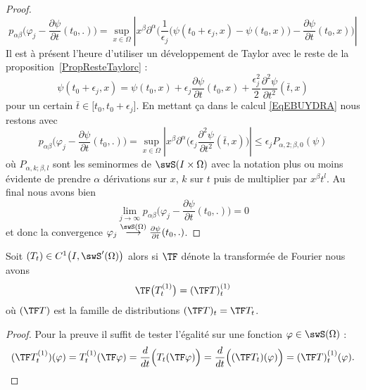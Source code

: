 \begin{proof}
\begin{equation}
            p_{\alpha\beta}\big( \varphi_j-\frac{ \partial \psi }{ \partial t }(t_0,.) \big)=\sup_{x\in\Omega}\left| x^{\beta}\partial^{\alpha}\Big( \frac{1}{ \epsilon_j }\big(\psi(t_0+\epsilon_j,x)-\psi(t_0,x)\big) -\frac{ \partial \psi }{ \partial t }(t_0,x) \Big)\right|
    \end{equation}
    Il est à présent l'heure d'utiliser un développement de Taylor avec le reste de la proposition~\ref{PropResteTaylorc} :
    \begin{equation}
        \psi(t_0+\epsilon_j,x)=\psi(t_0,x)+\epsilon_j\frac{ \partial \psi }{ \partial t }(t_0,x)+\frac{ \epsilon_j^2 }{2}\frac{ \partial^2\psi  }{ \partial t^2 }(\bar t,x)
    \end{equation}
    pour un certain \( \bar t\in\mathopen[ t_0 , t_0+\epsilon_j \mathclose]\). En mettant ça dans le calcul \eqref{EqEBUYDRA} nous restons avec
    \begin{equation}
        p_{\alpha\beta}\big( \varphi_j-\frac{ \partial \psi }{ \partial t }(t_0,.) \big)=\sup_{x\in\Omega}\left| x^{\beta}\partial^{\alpha}\Big( \epsilon_j\frac{ \partial^2\psi }{ \partial t^2 }(\bar t,x) \Big) \right| \leq \epsilon_j P_{\alpha,2;\beta,0}(\psi)
    \end{equation}
    où \( P_{\alpha,k;\beta,l}\) sont les seminormes de \( \swS(I\times \Omega)\) avec la notation plus ou moins évidente de prendre \( \alpha\) dérivations sur \( x\), \( k\) sur \( t\) puis de multiplier par \( x^{\beta}t^l\). Au final nous avons bien
    \begin{equation}
        \lim_{j\to \infty} p_{\alpha\beta}\big( \varphi_j-\frac{ \partial \psi }{ \partial t }(t_0,.) \big)=0
    \end{equation}
    et donc la convergence \( \varphi_j\stackrel{\swS(\Omega)}{\longrightarrow}\frac{ \partial \psi }{ \partial t }(t_0,.)\).
\end{proof}

\begin{lemma}   \label{LemWRoRPIX}
    Soit \( (T_t)\in C^1\big( I,\swS'(\Omega) \big)\) alors si \( \TF\) dénote la transformée de Fourier nous avons
    \begin{equation}
        \TF\big( T_t^{(1)} \big)=(\TF T)_t^{(1)}
    \end{equation}
    où \( (\TF T)\) est la famille de distributions \( (\TF T)_t=\TF T_t\).
\end{lemma}

\begin{proof}
    Pour la preuve il suffit de tester l'égalité sur une fonction \( \varphi\in\swS(\Omega)\) :
    \begin{equation}
        (\TF T_t^{(1)})(\varphi)=T_t^{(1)}(\TF \varphi)=\frac{ d }{ dt }\Big( T_t(\TF \varphi) \Big)=\frac{ d }{ dt }\Big( (\TF T_t)(\varphi) \Big)=(\TF T)_t^{(1)}(\varphi).
    \end{equation}
\end{proof}

